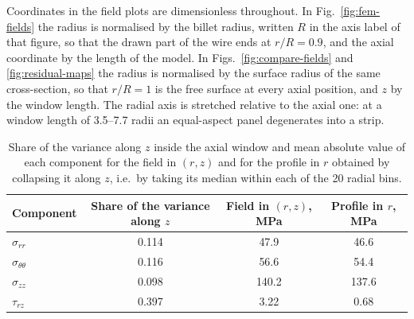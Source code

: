 Coordinates in the field plots are dimensionless throughout. In Fig.~\ref{fig:fem-fields} the radius is normalised by the billet radius, written $R$ in the axis label of that figure, so that the drawn part of the wire ends at $r/R = 0.9$, and the axial coordinate by the length of the model. %
In Figs.~\ref{fig:compare-fields} and \ref{fig:residual-maps} the radius is normalised by the surface radius of the same cross-section, so that $r/R = 1$ is the free surface at every axial position, and $z$ by the window length. %
The radial axis is stretched relative to the axial one: at a window length of 3.5--7.7 radii an equal-aspect panel degenerates into a strip. %

\begin{table}[htbp]
\centering\small
\caption[Variance along $z$ and the effect of collapsing the field]{Share of the variance along $z$ inside the axial window and mean absolute value of each component for the field in $(r,z)$ and for the profile in $r$ obtained by collapsing it along $z$, i.e.\ by taking its median within each of the 20 radial bins.} %
\label{tab:zshare}
\begin{tabular}{@{}lccc@{}}
\toprule
Component & Share of the variance along $z$ & Field in $(r,z)$, MPa & Profile in $r$, MPa \\
\midrule
$\sigma_{rr}$           & 0.114 & 47.9  & 46.6  \\ %
$\sigma_{\theta\theta}$ & 0.116 & 56.6  & 54.4  \\ %
$\sigma_{zz}$           & 0.098 & 140.2 & 137.6 \\ %
$\tau_{rz}$             & 0.397 & 3.22  & 0.68  \\ %
\bottomrule
\end{tabular}
\end{table}

